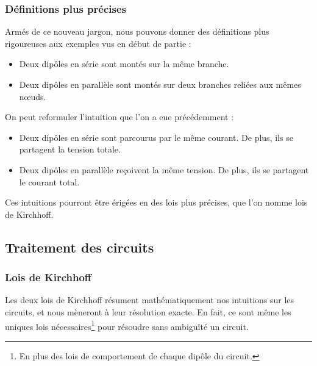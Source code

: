 \documentclass{article}
\begin{document}
\subsubsection{Définitions plus précises}
Armés de ce nouveau jargon, nous pouvons donner des définitions plus rigoureuses aux exemples vus en début de partie :
\begin{tcolorbox}[title=Parallèle et série]
\begin{itemize}
    \item Deux dipôles en série sont montés sur la même branche.
    \item Deux dipôles en parallèle sont montés sur deux branches reliées aux mêmes n\oe{}uds.
\end{itemize}
\end{tcolorbox}

On peut reformuler l'intuition que l'on a eue précédemment :

\begin{itemize}
    \item Deux dipôles en série sont parcourus par le même courant. De plus, ils se partagent la tension totale.
    \item Deux dipôles en parallèle reçoivent la même tension. De plus, ils se partagent le courant total.
\end{itemize}

Ces intuitions pourront être érigées en des lois plus précises, que l'on nomme lois de Kirchhoff.

\subsection{Traitement des circuits}
\subsubsection{Lois de Kirchhoff}

Les deux lois de Kirchhoff résument mathématiquement nos intuitions sur les circuits, et nous mèneront à leur résolution exacte. En fait, ce sont même les uniques lois nécessaires\footnote{En plus des lois de comportement de chaque dipôle du circuit.} pour résoudre sans ambiguïté un circuit.
\end{document}
